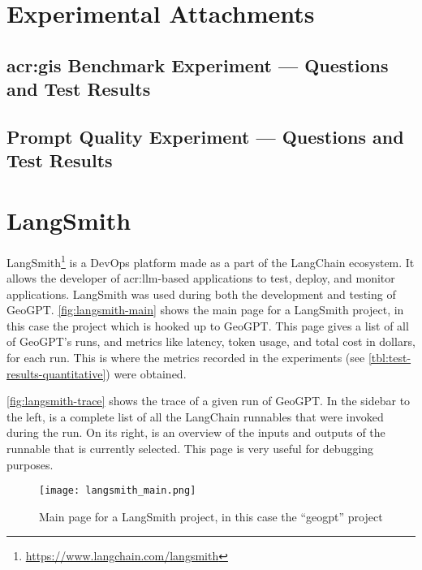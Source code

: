 \appendix

\chapter{Experimental Attachments}
\label{app:experiments}

\section[GIS Benchmark Experiment --- Questions and Test Results]{\acrshort{acr:gis} Benchmark Experiment --- Questions and Test Results}
\label{appsec:questions-and-answer}


\newpage


\newpage

\section{Prompt Quality Experiment --- Questions and Test Results}

\newpage



\chapter{LangSmith}
\label{app:langsmith}

LangSmith\footnote{\url{https://www.langchain.com/langsmith}} is a DevOps platform made as a part of the LangChain ecosystem. It allows the developer of \acrshort{acr:llm}-based applications to test, deploy, and monitor applications. LangSmith was used during both the development and testing of GeoGPT. \autoref{fig:langsmith-main} shows the main page for a LangSmith project, in this case the project which is hooked up to GeoGPT. This page gives a list of all of GeoGPT's runs, and metrics like latency, token usage, and total cost in dollars, for each run. This is where the metrics recorded in the experiments (see \autoref{tbl:test-results-quantitative}) were obtained.

\autoref{fig:langsmith-trace} shows the trace of a given run of GeoGPT. In the sidebar to the left, is a complete list of all the LangChain runnables that were invoked during the run. On its right, is an overview of the inputs and outputs of the runnable that is currently selected. This page is very useful for debugging purposes.

\begin{sidewaysfigure}
    \centering
    \texttt{[image: langsmith\_main.png]}
    \caption[Main page for a LangSmith project]{Main page for a LangSmith project, in this case the \enquote{geogpt} project}
    \label{fig:langsmith-main}
\end{sidewaysfigure}

